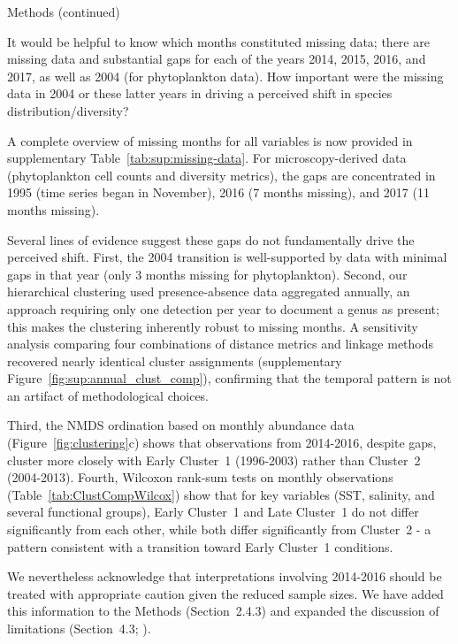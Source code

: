 \documentclass[12pt,english]{reviewresponse}
\begin{document}
\begin{revcomment}\label{comment:phyto-coverage}
	Methods (continued)

    It would be helpful to know which months constituted missing data; there are missing data and substantial gaps for each of the years 2014, 2015, 2016, and 2017, as well as 2004 (for phytoplankton data). How important were the missing data in 2004 or these latter years in driving a perceived shift in species distribution/diversity?
\end{revcomment}
\begin{revresponse}
    A complete overview of missing months for all variables is now provided in supplementary Table~\ref{tab:sup:missing-data}. For microscopy-derived data (phytoplankton cell counts and diversity metrics), the gaps are concentrated in 1995 (time series began in November), 2016 (7 months missing), and 2017 (11 months missing).
    
    Several lines of evidence suggest these gaps do not fundamentally drive the perceived shift. First, the 2004 transition is well-supported by data with minimal gaps in that year (only 3 months missing for phytoplankton). Second, our hierarchical clustering used presence-absence data aggregated annually, an approach requiring only one detection per year to document a genus as present; this makes the clustering inherently robust to missing months. A sensitivity analysis comparing four combinations of distance metrics and linkage methods recovered nearly identical cluster assignments (supplementary Figure~\ref{fig:sup:annual_clust_comp}), confirming that the temporal pattern is not an artifact of methodological choices.
    
    Third, the NMDS ordination based on monthly abundance data (Figure~\ref{fig:clustering}c) shows that observations from 2014-2016, despite gaps, cluster more closely with Early Cluster~1 (1996-2003) rather than Cluster~2 (2004-2013). Fourth, Wilcoxon rank-sum tests on monthly observations (Table~\ref{tab:ClustCompWilcox}) show that for key variables (SST, salinity, and several functional groups), Early Cluster~1 and Late Cluster~1 do not differ significantly from each other, while both differ significantly from Cluster~2 - a pattern consistent with a transition toward Early Cluster~1 conditions.
    
    We nevertheless acknowledge that interpretations involving 2014-2016 should be treated with appropriate caution given the reduced sample sizes. We have added this information to the Methods (Section~2.4.3) and expanded the discussion of limitations (Section~4.3; ).
\end{revresponse}
\end{document}

